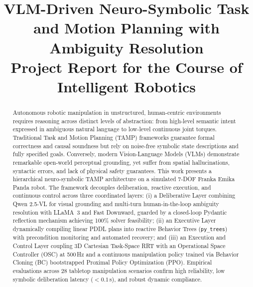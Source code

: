 \documentclass[conference]{IEEEtran}
\begin{document}
\title{VLM-Driven Neuro-Symbolic Task and Motion Planning with Ambiguity Resolution\\
\large Project Report for the Course of Intelligent Robotics}

\author{
\and
{}
}

\maketitle

\begin{abstract}
Autonomous robotic manipulation in unstructured, human-centric environments requires reasoning across distinct levels of abstraction: from high-level semantic intent expressed in ambiguous natural language to low-level continuous joint torques. Traditional Task and Motion Planning (TAMP) frameworks guarantee formal correctness and causal soundness but rely on noise-free symbolic state descriptions and fully specified goals. Conversely, modern Vision-Language Models (VLMs) demonstrate remarkable open-world perceptual grounding, yet suffer from spatial hallucinations, syntactic errors, and lack of physical safety guarantees. This work presents a hierarchical neuro-symbolic TAMP architecture on a simulated 7-DOF Franka Emika Panda robot. The framework decouples deliberation, reactive execution, and continuous control across three coordinated layers: (i) a Deliberative Layer combining Qwen 2.5-VL for visual grounding and multi-turn human-in-the-loop ambiguity resolution with LLaMA~3 and Fast Downward, guarded by a closed-loop Pydantic reflection mechanism achieving 100\% solver feasibility; (ii) an Executive Layer dynamically compiling linear PDDL plans into reactive Behavior Trees (\texttt{py\_trees}) with precondition monitoring and automated recovery; and (iii) an Execution and Control Layer coupling 3D Cartesian Task-Space RRT with an Operational Space Controller (OSC) at 500\,Hz and a continuous manipulation policy trained via Behavior Cloning (BC) bootstrapped Proximal Policy Optimization (PPO). Empirical evaluations across 28 tabletop manipulation scenarios confirm high reliability, low symbolic deliberation latency ($<0.1$\,s), and robust dynamic compliance.
\end{abstract}
\end{document}
